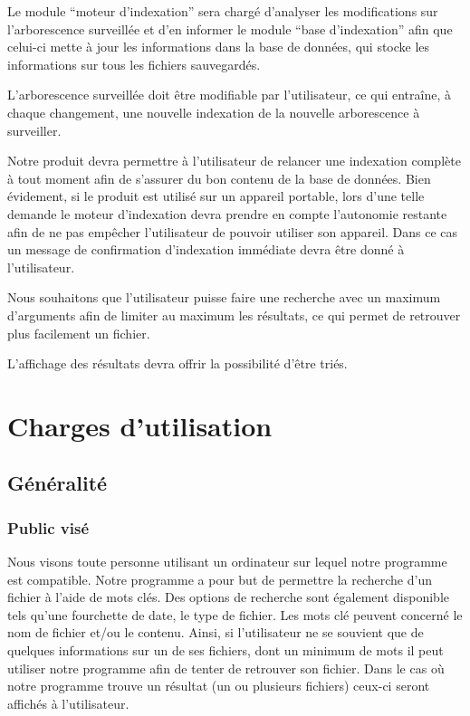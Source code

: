 \documentclass[a4paper,12pt]{report}
\begin{document}
Le module \enquote{moteur d'indexation} sera chargé d'analyser les modifications sur l'\gls{arborescence} surveillée et d'en informer le module \enquote{base d'indexation} afin que celui-ci mette à jour les informations dans la base de données, qui stocke les informations sur tous les \glspl{fichier} sauvegardés.

L'\gls{arborescence} surveillée doit être modifiable par l'utilisateur, ce qui entraîne, à chaque changement, une nouvelle indexation de la nouvelle \gls{arborescence} à surveiller.

Notre produit devra permettre à l'utilisateur de relancer une indexation complète à tout
moment afin de s'assurer du bon contenu de la base de données. Bien évidement, si le
produit est utilisé sur un appareil portable, lors d'une telle demande le moteur d'indexation devra prendre en compte l'autonomie restante afin de ne pas empêcher l'utilisateur de pouvoir utiliser son appareil. Dans ce cas un message de confirmation d'indexation immédiate devra être donné à l'utilisateur.

Nous souhaitons que l'utilisateur puisse faire une recherche avec un maximum d'arguments
afin de limiter au maximum les résultats, ce qui permet de retrouver plus facilement un \gls{fichier}.

L'affichage des résultats devra offrir la possibilité d'être triés.

\chapter{Charges d'utilisation}

\section{Généralité}

\subsection{Public visé}
Nous visons toute personne utilisant un ordinateur sur lequel notre programme est compatible. Notre programme a pour but de permettre la recherche d'un \gls{fichier} à l'aide de mots clés. Des options de recherche sont également disponible tels qu'une fourchette de date, le type de \gls{fichier}. Les mots clé peuvent concerné le nom de \gls{fichier} et/ou le contenu. Ainsi, si l'utilisateur ne se souvient que de quelques informations sur un de ses \glspl{fichier}, dont un minimum de mots il peut utiliser notre programme afin de tenter de retrouver son \gls{fichier}. Dans le cas où notre programme trouve un résultat (un ou plusieurs \glspl{fichier}) ceux-ci seront affichés à l'utilisateur.
\end{document}
